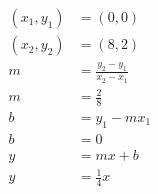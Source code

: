 \documentclass[preview,varwidth ,multi]{standalone}
\begin{document}
\preview
$\begin{aligned}
(x_1, y_1) &= (0, 0) \\
(x_2, y_2) &= (8, 2) \\[3pt]
m &= \frac{y_2 - y_1}{x_2 - x_1} \\
m &= \frac{2}{8} \\[3pt]
b &= y_1 - mx_1 \\
b &= 0 \\[3pt]
y &= mx + b \\
y &= \frac{1}{4}x
\end{aligned}$
\endpreview
\end{document}
